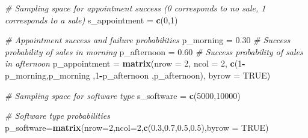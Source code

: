\documentclass[
]{article}
\newenvironment{Shaded}{\begin{snugshade}}{\end{snugshade}}
\newcommand{\AttributeTok}[1]{\textcolor[rgb]{0.13,0.29,0.53}{#1}}
\newcommand{\CommentTok}[1]{\textcolor[rgb]{0.56,0.35,0.01}{\textit{#1}}}
\newcommand{\ConstantTok}[1]{\textcolor[rgb]{0.56,0.35,0.01}{#1}}
\newcommand{\DecValTok}[1]{\textcolor[rgb]{0.00,0.00,0.81}{#1}}
\newcommand{\FloatTok}[1]{\textcolor[rgb]{0.00,0.00,0.81}{#1}}
\newcommand{\FunctionTok}[1]{\textcolor[rgb]{0.13,0.29,0.53}{\textbf{#1}}}
\newcommand{\NormalTok}[1]{#1}
\newcommand{\OtherTok}[1]{\textcolor[rgb]{0.56,0.35,0.01}{#1}}
\newcommand{\SpecialCharTok}[1]{\textcolor[rgb]{0.81,0.36,0.00}{\textbf{#1}}}
\begin{document}
\begin{Shaded}
\begin{Highlighting}[]
\CommentTok{\# Sampling space for appointment success (0 corresponds to no sale, 1 corresponds to a sale)}
\NormalTok{s\_appointment }\OtherTok{=} \FunctionTok{c}\NormalTok{(}\DecValTok{0}\NormalTok{,}\DecValTok{1}\NormalTok{)}

\CommentTok{\# Appointment success and failure probabilities}
\NormalTok{p\_morning }\OtherTok{=} \FloatTok{0.30} \CommentTok{\# Success probability of sales in morning}
\NormalTok{p\_afternoon }\OtherTok{=} \FloatTok{0.60}  \CommentTok{\# Success probability of sales in afternoon}
\NormalTok{p\_appointment }\OtherTok{=} \FunctionTok{matrix}\NormalTok{(}\AttributeTok{nrow  =} \DecValTok{2}\NormalTok{, }\AttributeTok{ncol =} \DecValTok{2}\NormalTok{, }\FunctionTok{c}\NormalTok{(}\DecValTok{1}\SpecialCharTok{{-}}\NormalTok{p\_morning,p\_morning ,}\DecValTok{1}\SpecialCharTok{{-}}\NormalTok{p\_afternoon ,p\_afternoon), }\AttributeTok{byrow =} \ConstantTok{TRUE}\NormalTok{)}

\CommentTok{\# Sampling space for software type}
\NormalTok{s\_software }\OtherTok{=} \FunctionTok{c}\NormalTok{(}\DecValTok{5000}\NormalTok{,}\DecValTok{10000}\NormalTok{)}
  
\CommentTok{\# Software type probabilities}
\NormalTok{p\_software}\OtherTok{=}\FunctionTok{matrix}\NormalTok{(}\AttributeTok{nrow=}\DecValTok{2}\NormalTok{,}\AttributeTok{ncol=}\DecValTok{2}\NormalTok{,}\FunctionTok{c}\NormalTok{(}\FloatTok{0.3}\NormalTok{,}\FloatTok{0.7}\NormalTok{,}\FloatTok{0.5}\NormalTok{,}\FloatTok{0.5}\NormalTok{),}\AttributeTok{byrow =} \ConstantTok{TRUE}\NormalTok{)}


\end{Highlighting}
\end{Shaded}
\end{document}
